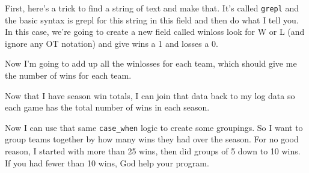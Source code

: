 \documentclass[]{book}
\newenvironment{Shaded}{\begin{snugshade}}{\end{snugshade}}
\newcommand{\KeywordTok}[1]{\textcolor[rgb]{0.13,0.29,0.53}{\textbf{#1}}}
\newcommand{\DataTypeTok}[1]{\textcolor[rgb]{0.13,0.29,0.53}{#1}}
\newcommand{\DecValTok}[1]{\textcolor[rgb]{0.00,0.00,0.81}{#1}}
\newcommand{\StringTok}[1]{\textcolor[rgb]{0.31,0.60,0.02}{#1}}
\newcommand{\OperatorTok}[1]{\textcolor[rgb]{0.81,0.36,0.00}{\textbf{#1}}}
\newcommand{\NormalTok}[1]{#1}
\begin{document}
First, here's a trick to find a string of text and make that. It's
called \texttt{grepl} and the basic syntax is grepl for this string in
this field and then do what I tell you. In this case, we're going to
create a new field called winloss look for W or L (and ignore any OT
notation) and give wins a 1 and losses a 0.

\begin{Shaded}
\end{Shaded}

Now I'm going to add up all the winlosses for each team, which should
give me the number of wins for each team.

\begin{Shaded}
\end{Shaded}

Now that I have season win totals, I can join that data back to my log
data so each game has the total number of wins in each season.

\begin{Shaded}
\end{Shaded}

Now I can use that same \texttt{case\_when} logic to create some
groupings. So I want to group teams together by how many wins they had
over the season. For no good reason, I started with more than 25 wins,
then did groups of 5 down to 10 wins. If you had fewer than 10 wins, God
help your program.
\end{document}
